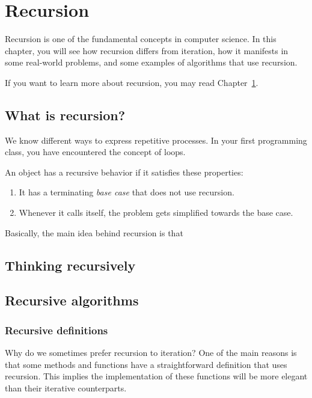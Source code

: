 \chapter{Recursion}
\label{chap:recursion}

Recursion is one of the fundamental concepts in computer science. In this chapter, you will see how recursion differs from iteration, how it manifests in some real-world problems, and some examples of algorithms that use recursion.

If you want to learn more about recursion, you may read Chapter~\ref{chap:recursion}.

\section{What is recursion?}
We know different ways to express repetitive processes. In your first programming class, you have encountered the concept of loops. 

\begin{definition}
An object has a recursive behavior if it satisfies these properties:
\begin{enumerate}
    \item It has a terminating \textit{base case} that does not use recursion.
    \item Whenever it calls itself, the problem gets simplified towards the base case.
\end{enumerate}
\end{definition}

Basically, the main idea behind recursion is that 

\section{Thinking recursively}


\section{Recursive algorithms}

\subsection{Recursive definitions}
Why do we sometimes prefer recursion to iteration? One of the main reasons is that some methods and functions have a straightforward definition that uses recursion. This implies the implementation of these functions will be more elegant than their iterative counterparts.


